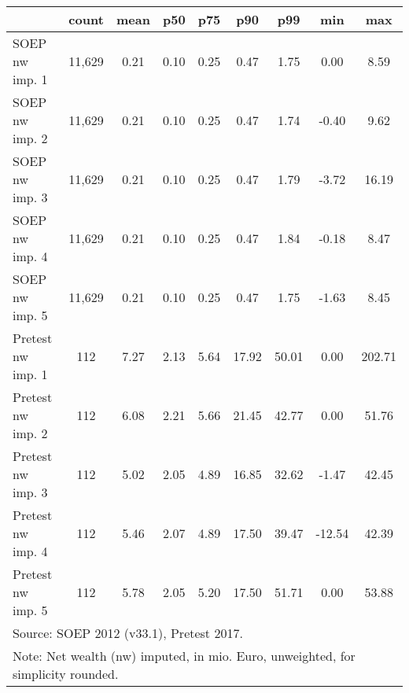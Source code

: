 {
\def\sym#1{\ifmmode^{#1}\else\(^{#1}\)\fi}
\begin{tabular}{l*{1}{cccccccc}}
\hline\hline
                                            &       count&        mean&         p50&         p75&         p90&         p99&         min&         max\\
\hline
SOEP nw imp. 1                              &      11,629&        0.21&        0.10&        0.25&        0.47&        1.75&        0.00&        8.59\\
SOEP nw imp. 2                              &      11,629&        0.21&        0.10&        0.25&        0.47&        1.74&       -0.40&        9.62\\
SOEP nw imp. 3                              &      11,629&        0.21&        0.10&        0.25&        0.47&        1.79&       -3.72&       16.19\\
SOEP nw imp. 4                              &      11,629&        0.21&        0.10&        0.25&        0.47&        1.84&       -0.18&        8.47\\
SOEP nw imp. 5                              &      11,629&        0.21&        0.10&        0.25&        0.47&        1.75&       -1.63&        8.45\\
Pretest nw imp. 1                           &         112&        7.27&        2.13&        5.64&       17.92&       50.01&        0.00&      202.71\\
Pretest nw imp. 2                           &         112&        6.08&        2.21&        5.66&       21.45&       42.77&        0.00&       51.76\\
Pretest nw imp. 3                           &         112&        5.02&        2.05&        4.89&       16.85&       32.62&       -1.47&       42.45\\
Pretest nw imp. 4                           &         112&        5.46&        2.07&        4.89&       17.50&       39.47&      -12.54&       42.39\\
Pretest nw imp. 5                           &         112&        5.78&        2.05&        5.20&       17.50&       51.71&        0.00&       53.88\\
\hline\hline
\multicolumn{9}{l}{\footnotesize Source: SOEP 2012 (v33.1), Pretest 2017.}\\
\multicolumn{9}{l}{\footnotesize Note: Net wealth (nw) imputed, in mio. Euro, unweighted, for simplicity rounded.}\\
\end{tabular}
}
